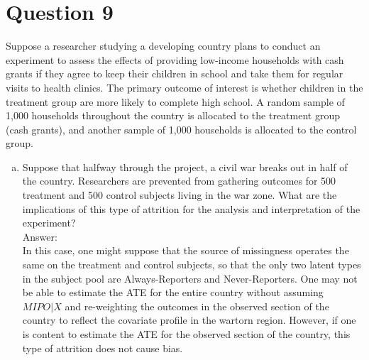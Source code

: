 \documentclass[11pt,notitlepage]{article}\usepackage[]{graphicx}\usepackage[]{color}
\begin{document}
\section*{Question 9}
Suppose a researcher studying a developing country plans to conduct an experiment to assess the effects of providing low-income households with cash grants if they agree to keep their children in school and take them for regular visits to health clinics. The primary outcome of interest is whether children in the treatment group are more likely to complete high school. A random sample of 1,000 households throughout the country is allocated to the treatment group (cash grants), and another sample of 1,000 households is allocated to the control group.

\begin{enumerate}[a)]
\item Suppose that halfway through the project, a civil war breaks out in half of the country. Researchers are prevented from gathering outcomes for 500 treatment and 500 control subjects living in the war zone. What are the implications of this type of attrition for the analysis and interpretation of the experiment?\\
Answer:\\
In this case, one might suppose that the source of missingness operates the same on the treatment and control subjects, so that the only two latent types in the subject pool are Always-Reporters and Never-Reporters. One may not be able to estimate the ATE for the entire country without assuming $MIPO|X$ and re-weighting the outcomes in the observed section of the country to reflect the covariate profile in the wartorn region. However, if one is content to estimate the ATE for the observed section of the country, this type of attrition does not cause bias.


\end{enumerate}
\end{document}
